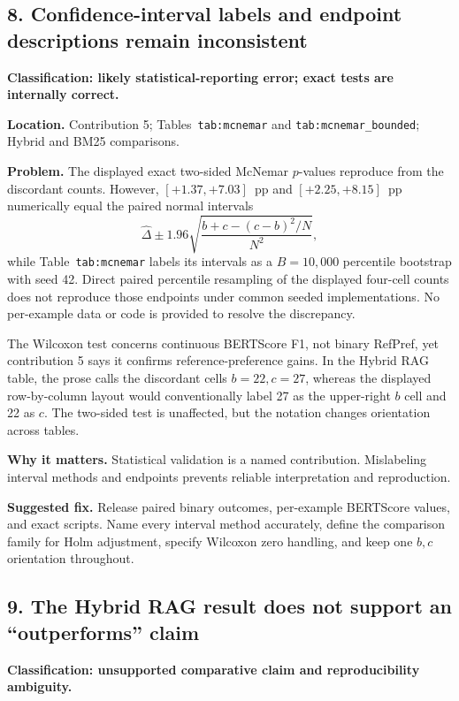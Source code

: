 \documentclass[11pt]{article}
\begin{document}
\subsection*{8. Confidence-interval labels and endpoint descriptions remain inconsistent}

\textbf{Classification: likely statistical-reporting error; exact tests are internally correct.}

\textbf{Location.} Contribution 5; Tables~\texttt{tab:mcnemar} and \texttt{tab:mcnemar\_bounded}; Hybrid and BM25 comparisons.

\textbf{Problem.} The displayed exact two-sided McNemar $p$-values reproduce from the discordant counts.  However, $[+1.37,+7.03]$~pp and $[+2.25,+8.15]$~pp numerically equal the paired normal intervals
\[
\widehat\Delta\pm1.96\sqrt{\frac{b+c-(c-b)^2/N}{N^2}},
\]
while Table~\texttt{tab:mcnemar} labels its intervals as a $B=10{,}000$ percentile bootstrap with seed 42.  Direct paired percentile resampling of the displayed four-cell counts does not reproduce those endpoints under common seeded implementations.  No per-example data or code is provided to resolve the discrepancy.

The Wilcoxon test concerns continuous BERTScore F1, not binary RefPref, yet contribution 5 says it confirms reference-preference gains.  In the Hybrid RAG table, the prose calls the discordant cells $b=22,c=27$, whereas the displayed row-by-column layout would conventionally label 27 as the upper-right $b$ cell and 22 as $c$.  The two-sided test is unaffected, but the notation changes orientation across tables.

\textbf{Why it matters.} Statistical validation is a named contribution.  Mislabeling interval methods and endpoints prevents reliable interpretation and reproduction.

\textbf{Suggested fix.} Release paired binary outcomes, per-example BERTScore values, and exact scripts.  Name every interval method accurately, define the comparison family for Holm adjustment, specify Wilcoxon zero handling, and keep one $b,c$ orientation throughout.

\subsection*{9. The Hybrid RAG result does not support an ``outperforms'' claim}

\textbf{Classification: unsupported comparative claim and reproducibility ambiguity.}
\end{document}
